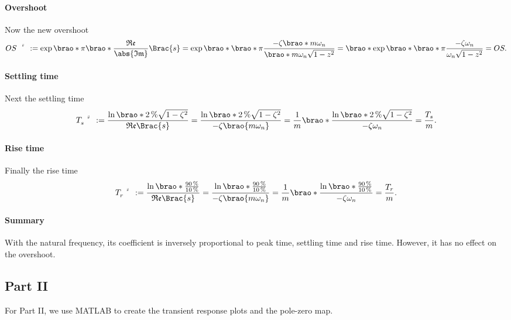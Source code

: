 \documentclass[11pt]{article}
\begin{document}
\begin{adjustwidth}{0.5in}{0in}
        \paragraph{Overshoot}
        Now the new overshoot
        \[
                \setprime[2]{OS}
                := \exp\brao*{\pi\brao*{\frac{\mathfrak{Re}}{\abs{\mathfrak{Im}}}}\Brac{s}}
                = \exp\brao*{\brao*\pi\frac
                    {-\zeta\brao*{m\omega_n}}
                    {\brao*{m\omega_n} \sqrt{1 - z^2}}
                }
                = \brao*{\exp\brao*{\brao*\pi\frac
                    {-\zeta\omega_n}
                    {\omega_n \sqrt{1 - z^2}}
                }}
                = OS.
        \]

        \paragraph{Settling time}
        Next the settling time
        \[
            \setprime[2]{T}_s
            := \frac{\ln\brao*{\SI2\percent \sqrt{1 - \zeta^2}}}{\mathfrak{Re}\Brac{s}}
            = \frac{\ln\brao*{\SI2\percent \sqrt{1 - \zeta^2}}}{-\zeta\brao{m\omega_n}}
            = \frac1m\brao*{\frac{\ln\brao*{\SI2\percent \sqrt{1 - \zeta^2}}}{-\zeta\omega_n}}
            = \frac{T_s}m.
        \]

        \paragraph{Rise time}
        Finally the rise time
        \[
            \setprime[2]T_r
            := \frac{\ln\brao*{\frac
                {\SI{90}\percent}
                {\SI{10}\percent}
            }}{\mathfrak{Re}\Brac{s}}
            = \frac{\ln\brao*{\frac
                {\SI{90}\percent}
                {\SI{10}\percent}
            }}{-\zeta\brao{m\omega_n}}
            = \frac1m\brao*{
                \frac{\ln\brao*{\frac
                    {\SI{90}\percent}
                    {\SI{10}\percent}
                }}{-\zeta\omega_n}
            }
            = \frac{T_r}m.
        \]

        \paragraph{Summary}
        With the natural frequency, its coefficient is inversely proportional to peak time, settling time and rise time. However, it has no effect on the overshoot.

    \subsection{Part II}
    For Part II, we use MATLAB to create the transient response plots and the pole-zero map.


\end{adjustwidth}
\end{document}
